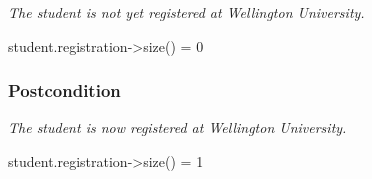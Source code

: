 \npar \hspace*{5 mm} \emph{The student is not yet registered at Wellington
University.} \par \hspace*{10 mm} student.registration->size() = 0

\subsubsection{Postcondition}

\par \hspace*{5 mm} \emph{The student is now registered at Wellington
University.}
\par \hspace*{10 mm} student.registration->size() = 1
